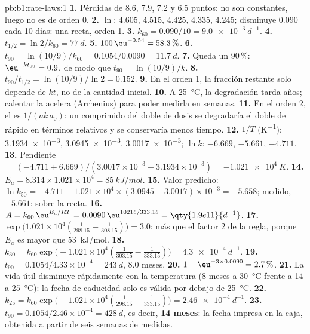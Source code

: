\begin{solution}{pb:b1:rate-laws:1}
\textbf{1.} Pérdidas de 8.6, 7.9, 7.2 y 6.5 puntos: no son constantes,
luego no es de orden 0.
\textbf{2.} $\ln$: 4.605, 4.515, 4.425, 4.335, 4.245; disminuye 0.090
cada 10 días: una recta, orden 1.
\textbf{3.} $k_{60} = 0.090/10 = \qty{9.0e-3}{d^{-1}}$.
\textbf{4.} $t_{1/2} = \ln2/k_{60} = \qty{77}{d}$.
\textbf{5.} $100\,\eu^{-0.54} = 58.3\,\%$.
\textbf{6.} $t_{90} = \ln(10/9)/k_{60} = 0.1054/0.0090 = \qty{11.7}{d}$.
\textbf{7.} Queda un 90\,\%: $\eu^{-kt_{90}} = 0.9$, de modo que $t_{90} = \ln(10/9)/k$.
\textbf{8.} $t_{90}/t_{1/2} = \ln(10/9)/\ln2 = 0.152$.
\textbf{9.} En el orden 1, la fracción restante solo depende de $kt$, no
de la cantidad inicial.
\textbf{10.} A \qty{25}{\celsius}, la degradación tarda años; calentar la
acelera (Arrhenius) para poder medirla en semanas.
\textbf{11.} En el orden 2, el  es $1/(ak\,a_0)$:
un comprimido del doble de dosis se degradaría el doble de rápido en
términos relativos y se conservaría menos tiempo.
\textbf{12.} $1/T$ (\unit{K^{-1}}): \num{3.1934e-3}, \num{3.0945e-3},
\num{3.0017e-3}; $\ln k$: $-6.669$, $-5.661$, $-4.711$.
\textbf{13.} Pendiente $= (-4.711 + 6.669)/(3.0017 \times 10^{-3} - 3.1934 \times
10^{-3}) = \qty{-1.021e4}{K}$.
\textbf{14.} $E_a = 8.314 \times 1.021 \times 10^4 = \qty{85}{kJ/mol}$.
\textbf{15.} Valor predicho: $\ln k_{50} = -4.711 - 1.021 \times 10^4 \times (3.0945 -
3.0017) \times 10^{-3} = -5.658$; medido, $-5.661$: sobre la recta.
\textbf{16.} $A = k_{60}\,\eu^{E_a/RT} = 0.0090\,\eu^{10215/333.15} =
\qty{1.9e11}{d^{-1}}$.
\textbf{17.} $\exp\big(1.021 \times 10^4(\frac{1}{298.15} -
\frac{1}{308.15})\big) = 3.0$: más que el factor 2 de la regla, porque
$E_a$ es mayor que \qty{53}{kJ/mol}.
\textbf{18.} $k_{30} = k_{60}\exp\big(-1.021 \times 10^4(\frac{1}{303.15} -
\frac{1}{333.15})\big) = \qty{4.3e-4}{d^{-1}}$.
\textbf{19.} $t_{90} = 0.1054/4.33 \times 10^{-4} = \qty{243}{d}$, 8.0
meses.
\textbf{20.} $1 - \eu^{-3 \times 0.0090} = 2.7\,\%$.
\textbf{21.} La vida útil disminuye rápidamente con la temperatura (8
meses a \qty{30}{\celsius} frente a 14 a \qty{25}{\celsius}): la fecha de
caducidad solo es válida por debajo de \qty{25}{\celsius}.
\textbf{22.} $k_{25} = k_{60}\exp\big(-1.021 \times 10^4(\frac{1}{298.15} -
\frac{1}{333.15})\big) = \qty{2.46e-4}{d^{-1}}$.
\textbf{23.} $t_{90} = 0.1054/2.46 \times 10^{-4} = \qty{428}{d}$, es
decir, \textbf{14 meses}: la fecha impresa en la caja, obtenida a partir
de seis semanas de medidas.
\end{solution}
